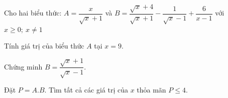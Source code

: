 
\begin{bt}
Cho hai biểu thức:
$A = \dfrac{x}{\sqrt{x}+1}$ và $B = \dfrac{\sqrt{x}+4}{\sqrt{x}+1} - \dfrac{1}{\sqrt{x}-1} + \dfrac{6}{x-1}$ với $x \ge 0;\ x \ne 1$
\begin{cacy}
\item Tính giá trị của biểu thức $A$ tại $x = 9$.
\item Chứng minh $B = \dfrac{\sqrt{x}+1}{\sqrt{x}-1}$.
\item Đặt $P = A.B$. Tìm tất cả các giá trị của $x$ thỏa mãn $P \le 4$.
\end{cacy}
\loigiai{}
\end{bt}
